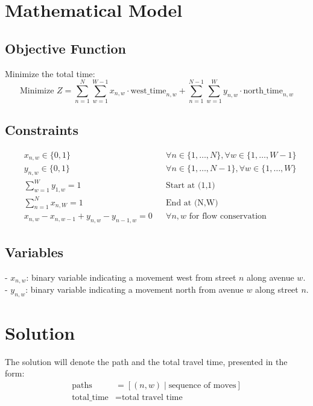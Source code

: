 \documentclass{article}
\begin{document}
\section*{Mathematical Model}

\subsection*{Objective Function}
Minimize the total time:
\[
\text{Minimize } Z = \sum_{n=1}^{N} \sum_{w=1}^{W-1} x_{n,w} \cdot \text{west\_time}_{n,w} + \sum_{n=1}^{N-1} \sum_{w=1}^{W} y_{n,w} \cdot \text{north\_time}_{n,w}
\]

\subsection*{Constraints}
\begin{align*}
& x_{n,w} \in \{0, 1\} && \forall n \in \{1, \ldots, N\}, \forall w \in \{1, \ldots, W-1\} \\
& y_{n,w} \in \{0, 1\} && \forall n \in \{1, \ldots, N-1\}, \forall w \in \{1, \ldots, W\} \\
& \sum_{w=1}^{W} y_{1,w} = 1 && \text{Start at (1,1)} \\
& \sum_{n=1}^{N} x_{n,W} = 1 && \text{End at (N,W)} \\
& x_{n,w} - x_{n,w-1} + y_{n,w} - y_{n-1,w} = 0 && \forall n, w \text{ for flow conservation}
\end{align*}

\subsection*{Variables}
- \( x_{n,w} \): binary variable indicating a movement west from street \( n \) along avenue \( w \).
- \( y_{n,w} \): binary variable indicating a movement north from avenue \( w \) along street \( n \).

\section*{Solution}
The solution will denote the path and the total travel time, presented in the form:
\[
\begin{align*}
\text{paths} &= [(n,w) \mid \text{sequence of moves}] \\
\text{total\_time} &= \text{total travel time}
\end{align*}
\]
\end{document}
